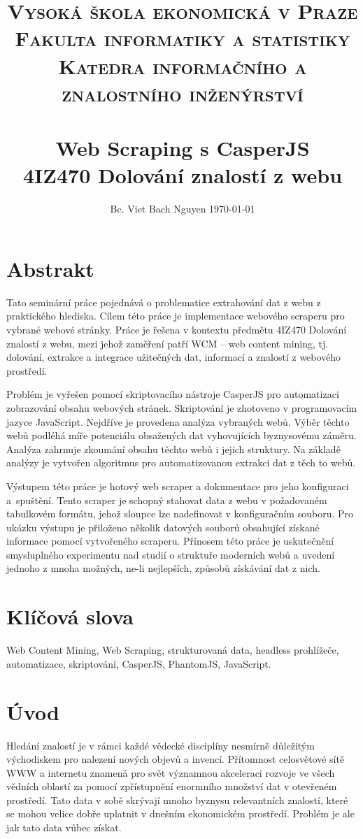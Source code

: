 \documentclass[11pt,a4paper]{article}
\title{	\normalsize\textsc {
          \large{Vysoká škola ekonomická v Praze}\\[0.3cm]	
          \large{Fakulta informatiky a statistiky}\\[0.3cm]
          \large{Katedra informačního a znalostního inženýrství}\\
        }
\textsc{} 	%
		 	\\[7.0cm]								%
			\huge \textbf{Web Scraping s CasperJS}	%
			\HRule{2pt} \\ [0.4cm]		%
            \normalsize \textbf{4IZ470 Dolování znalostí z webu}
		}
\author{
		Bc. Viet Bach Nguyen \hfill \today			%
}
\makeatletter
\def\printtitle{%
    {\centering \@title\par}}
\def\printauthor{%
    {\centering \large \@author}}
\makeatother
\begin{document}
\thispagestyle{empty}		%

\printtitle					%
  	\vfill
\printauthor				%
\newpage


\setcounter{page}{1}

\section*{Abstrakt}
Tato seminární práce pojednává o problematice extrahování dat z webu z praktického hlediska. Cílem této práce je implementace webového scraperu pro vybrané webové stránky. Práce je řešena v kontextu předmětu 4IZ470 Dolování znalostí z webu, mezi jehož zaměření patří WCM -- web content mining, tj. dolování, extrakce a integrace užitečných dat, informací a znalostí z webového prostředí. 

Problém je vyřešen pomocí skriptovacího nástroje CasperJS pro automatizaci zobrazování obsahu webových stránek. Skriptování je zhotoveno v programovacím jazyce JavaScript. Nejdříve je provedena analýza vybraných webů. Výběr těchto webů podléhá míře potenciálu obsažených dat vyhovujících byznysovému záměru. Analýza zahrnuje zkoumání obsahu těchto webů i jejich struktury. Na základě analýzy je vytvořen algoritmus pro automatizovanou extrakci dat z těch to webů. 

Výstupem této práce je hotový web scraper a dokumentace pro jeho konfiguraci a~spuštění. Tento scraper je schopný stahovat data z webu v požadovaném tabulkovém formátu, jehož sloupce lze nadefinovat v konfiguračním souboru. Pro ukázku výstupu je přiloženo několik datových souborů obsahující získané informace pomocí vytvořeného scraperu. Přínosem této práce je uskutečnění smysluplného experimentu nad studií o struktuře moderních webů a uvedení jednoho z mnoha možných, ne-li nejlepších, způsobů získávání dat z nich.

\section*{Klíčová slova}
Web Content Mining, Web Scraping, strukturovaná data, headless prohlížeče,\\ automatizace, skriptování, CasperJS, PhantomJS, JavaScript.

\newpage

 
\tableofcontents

\newpage

\section{Úvod}
Hledání znalostí je v rámci každé vědecké disciplíny nesmírně důležitým východiskem pro nalezení nových objevů a invencí. Přítomnost celosvětové sítě WWW a internetu znamená pro svět významnou akceleraci rozvoje ve všech vědních oblastí za pomocí zpřístupnění enormního množství dat v otevřeném prostředí. Tato data v sobě skrývají mnoho byznysu relevantních znalostí, které se mohou velice dobře uplatnit v dnešním ekonomickém prostředí. Problém je ale jak tato data vůbec získat.
\end{document}

